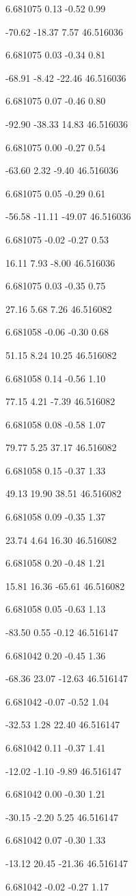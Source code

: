6.681075
0.13
-0.52
0.99

-70.62
-18.37
7.57
46.516036

6.681075
0.03
-0.34
0.81

-68.91
-8.42
-22.46
46.516036

6.681075
0.07
-0.46
0.80

-92.90
-38.33
14.83
46.516036

6.681075
0.00
-0.27
0.54

-63.60
2.32
-9.40
46.516036

6.681075
0.05
-0.29
0.61

-56.58
-11.11
-49.07
46.516036

6.681075
-0.02
-0.27
0.53

16.11
7.93
-8.00
46.516036

6.681075
0.03
-0.35
0.75

27.16
5.68
7.26
46.516082

6.681058
-0.06
-0.30
0.68

51.15
8.24
10.25
46.516082

6.681058
0.14
-0.56
1.10

77.15
4.21
-7.39
46.516082

6.681058
0.08
-0.58
1.07

79.77
5.25
37.17
46.516082

6.681058
0.15
-0.37
1.33

49.13
19.90
38.51
46.516082

6.681058
0.09
-0.35
1.37

23.74
4.64
16.30
46.516082

6.681058
0.20
-0.48
1.21

15.81
16.36
-65.61
46.516082

6.681058
0.05
-0.63
1.13

-83.50
0.55
-0.12
46.516147

6.681042
0.20
-0.45
1.36

-68.36
23.07
-12.63
46.516147

6.681042
-0.07
-0.52
1.04

-32.53
1.28
22.40
46.516147

6.681042
0.11
-0.37
1.41

-12.02
-1.10
-9.89
46.516147

6.681042
0.00
-0.30
1.21

-30.15
-2.20
5.25
46.516147

6.681042
0.07
-0.30
1.33

-13.12
20.45
-21.36
46.516147

6.681042
-0.02
-0.27
1.17

